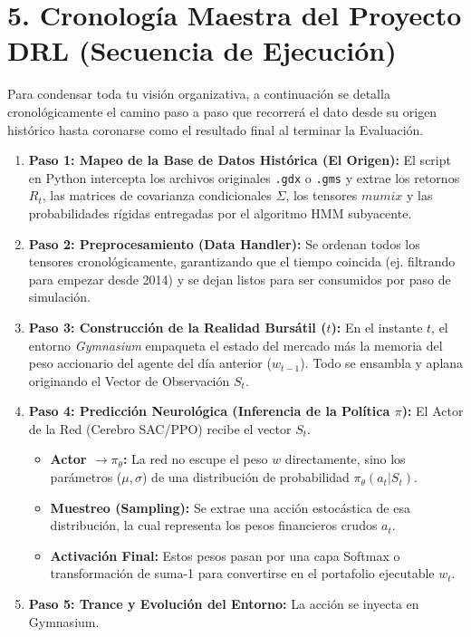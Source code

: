 \documentclass[11pt,a4paper]{article}
\begin{document}
\newpage
\section{5. Cronología Maestra del Proyecto DRL (Secuencia de Ejecución)}

Para condensar toda tu visión organizativa, a continuación se detalla cronológicamente el camino paso a paso que recorrerá el dato desde su origen histórico hasta coronarse como el resultado final al terminar la Evaluación.

\begin{enumerate}
    \item \textbf{Paso 1: Mapeo de la Base de Datos Histórica (El Origen):} El script en Python intercepta los archivos originales \texttt{.gdx} o \texttt{.gms} y extrae los retornos $R_t$, las matrices de covarianza condicionales $\Sigma$, los tensores $mumix$ y las probabilidades rígidas entregadas por el algoritmo HMM subyacente.
    \item \textbf{Paso 2: Preprocesamiento (Data Handler):} Se ordenan todos los tensores cronológicamente, garantizando que el tiempo coincida (ej. filtrando para empezar desde 2014) y se dejan listos para ser consumidos por paso de simulación.
    \item \textbf{Paso 3: Construcción de la Realidad Bursátil ($t$):} En el instante $t$, el entorno \textit{Gymnasium} empaqueta el estado del mercado más la memoria del peso accionario del agente del día anterior ($w_{t-1}$). Todo se ensambla y aplana originando el Vector de Observación $S_t$.
    \item \textbf{Paso 4: Predicción Neurológica (Inferencia de la Política $\pi$):} El Actor de la Red (Cerebro SAC/PPO) recibe el vector $S_t$. 
    \begin{itemize}
        \item \textbf{Actor $\rightarrow \pi_\theta$:} La red no escupe el peso $w$ directamente, sino los parámetros ($\mu, \sigma$) de una distribución de probabilidad $\pi_\theta(a_t|S_t)$.
        \item \textbf{Muestreo (Sampling):} Se extrae una acción estocástica de esa distribución, la cual representa los pesos financieros crudos $a_t$.
        \item \textbf{Activación Final:} Estos pesos pasan por una capa Softmax o transformación de suma-1 para convertirse en el portafolio ejecutable $w_t$.
    \end{itemize}
    \item \textbf{Paso 5: Trance y Evolución del Entorno:} La acción se inyecta en Gymnasium. 

\end{enumerate}
\end{document}
